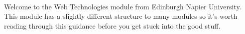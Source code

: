 \documentclass[12pt, a4paper, oneside]{book}
\begin{document}
\paragraph{} Welcome to the Web Technologies module from Edinburgh Napier University. This module has a slightly different structure to many modules so it's worth reading through this guidance before you get stuck into the good stuff.

\end{document}

